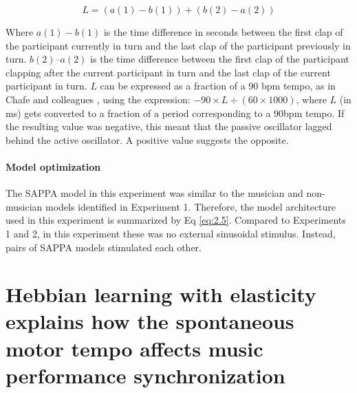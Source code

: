 \documentclass{report}
\begin{document}
\begin{equation}
L = (a(1) - b(1)) + (b(2) - a(2)) \label{eq:2.9}
\end{equation}

Where $a(1)- b(1)$ is the time difference in seconds between the first clap of the participant currently in turn and the last clap of the participant previously in turn. $b(2)–a(2)$ is the time difference between the first clap of the participant clapping after the current participant in turn and the last clap of the current participant in turn. $L$ can be expressed as a fraction of a 90 bpm tempo, as in Chafe and colleagues \cite{chafe2010effect}, using the expression: $- 90 \times L \div (60 \times 1000)$, where $L$ (in ms) gets converted to a fraction of a period corresponding to a 90bpm tempo. If the resulting value was negative, this meant that the passive oscillator lagged behind the active oscillator. A positive value suggests the opposite.

\subsubsection{Model optimization}

The SAPPA model in this experiment was similar to the musician and non-musician models identified in Experiment 1. Therefore, the model architecture used in this experiment is summarized by Eq \eqref{eq:2.5}. Compared to Experiments 1 and 2, in this experiment these was no external sinusoidal stimulus. Instead, pairs of SAPPA models stimulated each other.

\chapter{Hebbian learning with elasticity explains how the spontaneous motor tempo affects music performance synchronization}
\end{document}
